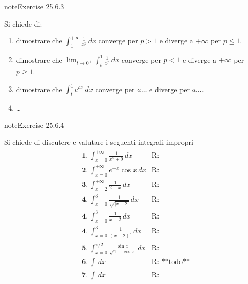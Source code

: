 \documentclass[letterpaper,10pt,italian]{jupyterBook}
\begin{document}
\begin{sphinxadmonition}{note}{Exercise 25.6.3}





\sphinxAtStartPar
Si chiede di:
\begin{enumerate}
%
\item {} 
\sphinxAtStartPar
dimostrare che \(\int_{1}^{+\infty} \frac{1}{x^p} \, dx\) converge per \(p > 1\) e diverge a \(+\infty\) per \(p \le 1\).

\item {} 
\sphinxAtStartPar
dimostrare che \(\lim_{t \rightarrow 0^+} \int_{t}^{1} \frac{1}{x^p} \, dx\) converge per \(p < 1\) e diverge a \(+\infty\) per \(p \ge 1\).

\item {} 
\sphinxAtStartPar
dimostrare che \(\int_{t}^{1} e^{a x} \, dx\) converge per \(a \dots\) e diverge per \(a \dots\).

\item {} 
\sphinxAtStartPar
…

\end{enumerate}
\end{sphinxadmonition}
 \label{exercise:ch/infinitesimal_calculus/integrals-problems-exercise-3}

\begin{sphinxadmonition}{note}{Exercise 25.6.4}



\sphinxAtStartPar
Si chiede di discutere e valutare i seguenti integrali impropri
\begin{equation*}
\begin{split}\begin{aligned}
 & \mathbf{1.} \,  \int_{x=0}^{+\infty} \frac{1}{x^2 + 9} \, dx & \text{R: } \\
 & \mathbf{2.} \,  \int_{x=0}^{+\infty} e^{-x} \cos x \, dx & \text{R: } \\
 & \mathbf{3.} \,  \int_{x=2}^{+\infty} \frac{1}{2-x} \, dx & \text{R: } \\
 & \mathbf{4.} \,  \int_{x=0}^{3} \frac{1}{\sqrt{|x-2|}}\, dx & \text{R: } \\
 & \mathbf{4.} \,  \int_{x=0}^{3} \frac{1}{x-2}\, dx & \text{R: } \\
 & \mathbf{4.} \,  \int_{x=0}^{3} \frac{1}{(x-2)^2}\, dx & \text{R: } \\
 & \mathbf{5.} \,  \int_{x=0}^{\pi/2} \frac{\sin x}{\sqrt{1-\cos x}} \, dx & \text{R: } \\
 & \mathbf{6.} \,  \int_{}^{} \, dx & \text{R: **todo**} \\
 & \mathbf{7.} \,  \int_{}^{} \, dx & \text{R: } \\
\end{aligned}\end{split}
\end{equation*}\end{sphinxadmonition}
\end{document}
